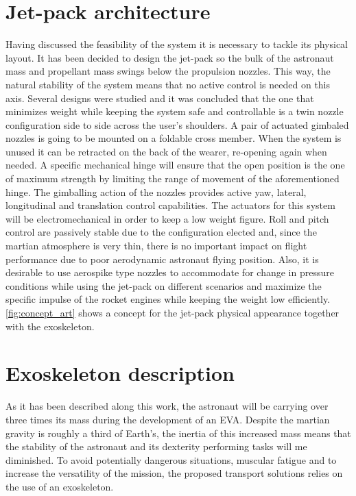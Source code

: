 \documentclass[twocolumn]{article}
\begin{document}
\section{Jet-pack architecture}

Having discussed the feasibility of the system it is necessary to tackle its 
physical layout. It has been decided to design the jet-pack so the bulk of the 
astronaut mass and propellant mass swings below the propulsion nozzles. This 
way, the natural stability of the system means that no active control is needed 
on this axis. Several designs were studied and it was concluded that the one 
that minimizes weight while keeping the system safe and controllable is a twin 
nozzle configuration side to side across the user's shoulders.
A pair of actuated gimbaled nozzles is going to be mounted on a foldable cross 
member. When the system is unused it can be retracted on the back of the 
wearer, re-opening again when needed. A specific mechanical hinge will ensure 
that the open position is the one of maximum strength by limiting the range of 
movement of the aforementioned hinge.
The gimballing action of the nozzles provides active yaw, lateral, longitudinal 
and translation control capabilities. The actuators for this system will be 
electromechanical in order to keep a low weight figure. Roll and pitch control 
are passively stable due to the configuration elected and, since the martian 
atmosphere is very thin, there is no important impact on flight performance due 
to poor aerodynamic astronaut flying position. Also, it is desirable to use 
aerospike type nozzles to accommodate for change in pressure conditions while 
using the jet-pack on different scenarios and maximize the specific impulse of 
the rocket engines while keeping the weight low efficiently.
\autoref{fig:concept_art} shows a concept for the jet-pack physical appearance 
together with the exoskeleton.

\section{Exoskeleton description}

As it has been described along this work, the astronaut will be carrying over 
three times its mass during the development of an EVA. Despite the martian 
gravity is roughly a third of Earth's, the inertia of this increased mass means 
that the stability of the astronaut and its dexterity performing tasks will me 
diminished. To avoid potentially dangerous situations, muscular fatigue and to 
increase the versatility of the mission, the proposed transport solutions 
relies on the use of an exoskeleton.
\end{document}
